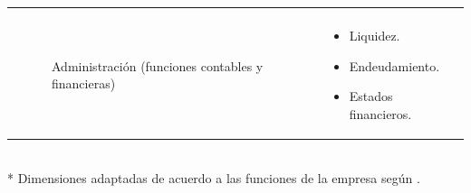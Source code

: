 \begin{table}
\begin{tabular}{|p{3cm}|p{4cm}|p{3.5cm}|p{3.5cm}|p{5cm}|}
\begin{itemize}[noitemsep]
     \end{itemize} \\ \cline{4-5}
     &  &  & Administración (funciones contables y financieras) &
     \begin{itemize}[noitemsep]
       \item Liquidez.
       \item Endeudamiento.
       \item Estados financieros.
     \end{itemize} \\ \hline
    \end{tabular}
    \\
    * Dimensiones adaptadas de acuerdo a las funciones de la empresa según \cite{fayol}.
\end{table}

\newpage
